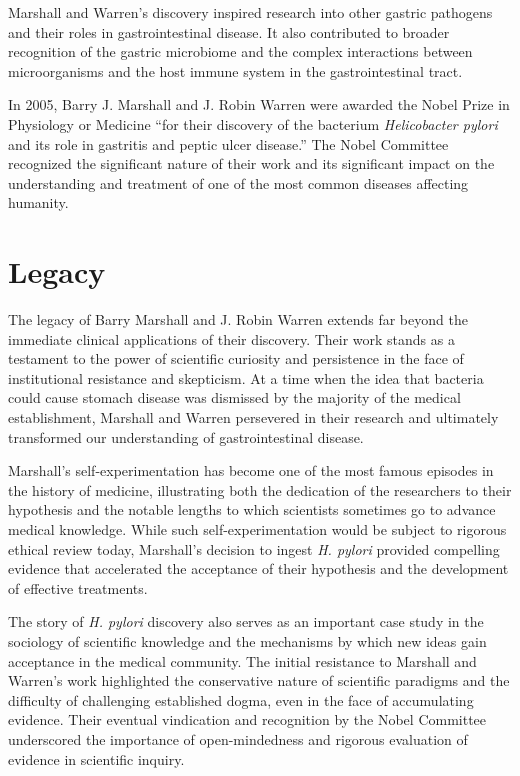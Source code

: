 Marshall and Warren's discovery inspired research into other gastric pathogens and their roles in gastrointestinal disease. It also contributed to broader recognition of the gastric microbiome and the complex interactions between microorganisms and the host immune system in the gastrointestinal tract.

In 2005, Barry J. Marshall and J. Robin Warren were awarded the Nobel Prize in Physiology or Medicine ``for their discovery of the bacterium \textit{Helicobacter pylori} and its role in gastritis and peptic ulcer disease.'' The Nobel Committee recognized the significant nature of their work and its significant impact on the understanding and treatment of one of the most common diseases affecting humanity.

\section{Legacy}

The legacy of Barry Marshall and J. Robin Warren extends far beyond the immediate clinical applications of their discovery. Their work stands as a testament to the power of scientific curiosity and persistence in the face of institutional resistance and skepticism. At a time when the idea that bacteria could cause stomach disease was dismissed by the majority of the medical establishment, Marshall and Warren persevered in their research and ultimately transformed our understanding of gastrointestinal disease.

Marshall's self-experimentation has become one of the most famous episodes in the history of medicine, illustrating both the dedication of the researchers to their hypothesis and the notable lengths to which scientists sometimes go to advance medical knowledge. While such self-experimentation would be subject to rigorous ethical review today, Marshall's decision to ingest \textit{H. pylori} provided compelling evidence that accelerated the acceptance of their hypothesis and the development of effective treatments.

The story of \textit{H. pylori} discovery also serves as an important case study in the sociology of scientific knowledge and the mechanisms by which new ideas gain acceptance in the medical community. The initial resistance to Marshall and Warren's work highlighted the conservative nature of scientific paradigms and the difficulty of challenging established dogma, even in the face of accumulating evidence. Their eventual vindication and recognition by the Nobel Committee underscored the importance of open-mindedness and rigorous evaluation of evidence in scientific inquiry.

